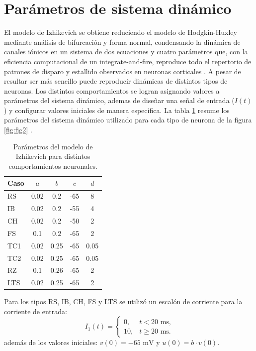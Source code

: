 \documentclass[aps,prl,twocolumn,superscriptaddress]{revtex4-2}
\begin{document}
\onecolumngrid

\appendix

\section{Parámetros de sistema dinámico}
El modelo de Izhikevich se obtiene reduciendo el modelo de Hodgkin-Huxley mediante análisis de bifurcación y forma normal, condensando la dinámica de canales iónicos en un sistema de dos ecuaciones y cuatro parámetros que, con la eficiencia computacional de un integrate-and-fire, reproduce todo el repertorio de patrones de disparo y estallido observados en neuronas corticales \cite{izhikevich2007dynamical}. A pesar de resultar ser más sencillo puede reproducir dinámicas de distintos tipos de neuronas. Los distintos comportamientos se logran asignando valores a parámetros del sistema dinámico, ademas de diseñar una señal de entrada ($I(t)$) y  configurar valores iniciales de manera especifica. La tabla \ref{tab:parametros_izhikevich} resume los parámetros del sistema dinámico utilizado para cada tipo de neurona de la figura \ref{fig:fig2} .



\begin{table}[ht]
    \centering
    \begin{tabular}{lcccc}
    \hline \hline
    Caso & $a$ & $b$ & $c$ & $d$ \\
    \hline
    RS  & 0.02 & 0.2  & -65 & 8 \\
    IB  & 0.02 & 0.2  & -55 & 4 \\
    CH  & 0.02 & 0.2  & -50 & 2 \\
    FS  & 0.1  & 0.2  & -65 & 2 \\
    TC1 & 0.02 & 0.25 & -65 & 0.05 \\
    TC2 & 0.02 & 0.25 & -65 & 0.05 \\
    RZ  & 0.1  & 0.26 & -65 & 2 \\
    LTS & 0.02 & 0.25 & -65 & 2 \\
    \hline
    \end{tabular}
    \caption{Parámetros del modelo de Izhikevich para distintos comportamientos neuronales.}
    \label{tab:parametros_izhikevich}
\end{table}



Para los tipos RS, IB, CH, FS y LTS se utilizó un escalón de corriente para la corriente de entrada:
\begin{equation}
    I_1(t) =
    \begin{cases} 
        0, & t < 20\text{ ms,} \\ 
        10, & t \geq 20\text{ ms.} 
    \end{cases}
\end{equation}
además de los valores iniciales: $v(0) = -65\text{ mV}$ y $u(0) = b \cdot v(0)$.
\end{document}
